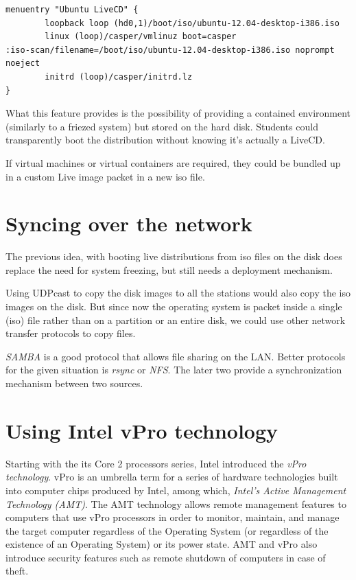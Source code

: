 \begin{verbatim}
menuentry "Ubuntu LiveCD" {
        loopback loop (hd0,1)/boot/iso/ubuntu-12.04-desktop-i386.iso
        linux (loop)/casper/vmlinuz boot=casper
:iso-scan/filename=/boot/iso/ubuntu-12.04-desktop-i386.iso noprompt
noeject
        initrd (loop)/casper/initrd.lz
}
\end{verbatim}

What this feature provides is the possibility of providing a contained
environment (similarly to a friezed system) but stored on the hard disk.
Students could transparently boot the distribution without knowing it's
actually a LiveCD.

If virtual machines or virtual containers are required, they could be
bundled up in a custom Live image packet in a new iso file.

\section{Syncing over the network}

The previous idea, with booting live distributions from iso files on the
disk does replace the need for system freezing, but still needs a
deployment mechanism.

Using UDPcast to copy the disk images to all the stations would also
copy the iso images on the disk. But since now the operating system is
packet inside a single (iso) file rather than on a partition or an
entire disk, we could use other network transfer protocols to copy
files.

\emph{SAMBA} is a good protocol that allows file sharing on the
\ac{LAN}. Better protocols for the given situation is \emph{rsync} or
\emph{\ac{NFS}}. The later two provide a synchronization mechanism
between two sources.


\section{Using Intel vPro technology}


Starting with the its Core 2 processors series, Intel introduced the
\emph{vPro technology}. vPro is an umbrella term for a series of
hardware technologies built into computer chips produced by Intel, among
which, \emph{Intel’s Active Management Technology (AMT)}. The \ac{AMT}
technology allows remote management features to computers that use vPro
processors in order to monitor, maintain, and manage the target computer
regardless of the Operating System (or regardless of the existence of an
Operating System) or its power state. \ac{AMT} and vPro also introduce
security features such as remote shutdown of computers in case of theft.

